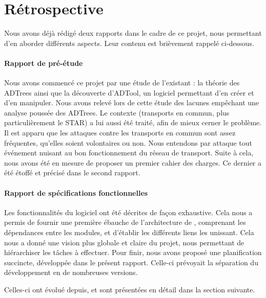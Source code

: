 \section{Rétrospective}
	\label{sec:retrospective}

	Nous avons déjà rédigé deux rapports dans le cadre de ce projet, nous permettant d'en aborder différents aspects. Leur contenu est brièvement rappelé ci-dessous.

	\paragraph{Rapport de pré-étude} Nous avons commencé ce projet par une étude de l'existant : la théorie des ADTrees ainsi que la découverte d'ADTool, un logiciel permettant d'en créer et d'en manipuler. Nous avons relevé lors de cette étude des lacunes empêchant une analyse poussée des ADTrees. Le contexte (transports en commun, plus particulièrement le STAR) a lui aussi été traité, afin de mieux cerner le problème. Il est apparu que les attaques contre les transports en commun sont assez fréquentes, qu'elles soient volontaires ou non. Nous entendons par \og attaque \fg{} tout événement nuisant au bon fonctionnement du réseau de transport. Suite à cela, nous avons été en mesure de proposer un premier cahier des charges. Ce dernier a été étoffé et précisé dans le second rapport.

	\paragraph{Rapport de spécifications fonctionnelles} Les fonctionnalités du logiciel ont été décrites de façon exhaustive. Cela nous a permis de fournir une première ébauche de l'architecture de \glasir{}, comprenant les dépendances entre les modules, et d'établir les différents liens les unissant. Cela nous a donné une vision plus globale et claire du projet, nous permettant de hiérarchiser les tâches à effectuer. Pour finir, nous avons proposé une planification succincte, développée dans le présent rapport. Celle-ci prévoyait la séparation du développement en de nombreuses versions.

	Celles-ci ont évolué depuis, et sont présentées en détail dans la section suivante.
